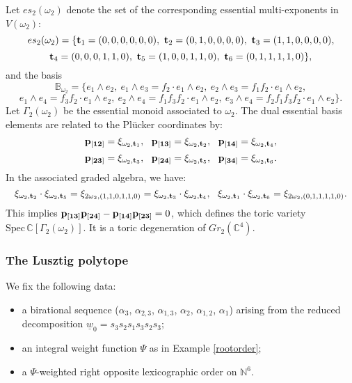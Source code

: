 \documentclass{emsprocart}
\theoremstyle{definition}
\begin{document}
Let $es_2(\omega_2)$ denote the set of the corresponding essential multi-exponents in $V(\omega_2)$:
$$es_2(\omega_2)=\{\bold{t}_1=(0,0,0,0,0,0),\ \bold{t}_2=(0,1,0,0,0,0),\ \bold{t}_3=(1,1,0,0,0,0),$$ $$\bold{t}_4=(0,0,0,1,1,0),\ \bold{t}_5=(1,0,0,1,1,0),\ \bold{t}_6=(0,1,1,1,1,0)\},$$
and the basis
$$\mathbb{B}_{\omega_2}=\{e_1\wedge e_2,\ e_1\wedge e_3=f_2\cdot e_1\wedge e_2,\ e_2\wedge e_3=f_1f_2\cdot e_1\wedge e_2,$$
$$e_1\wedge e_4=f_3f_2\cdot e_1\wedge e_2,\ e_2\wedge e_4=f_1f_3f_2\cdot e_1\wedge e_2,\ e_3\wedge e_4=f_2f_1f_3f_2\cdot e_1\wedge e_2\}.$$
Let $\Gamma_2(\omega_2)$ be the essential monoid associated to $\omega_2$. The dual essential basis elements are related to the Pl\"ucker coordinates by:
$$\bold{p_{[12]}}=\xi_{\omega_2,\bold{t}_1},\ \ \bold{p_{[13]}}=\xi_{\omega_2,\bold{t}_2},\ \ \bold{p_{[14]}}=\xi_{\omega_2,\bold{t}_4},$$
$$\bold{p_{[23]}}=\xi_{\omega_2,\bold{t}_3},\ \ \bold{p_{[24]}}=\xi_{\omega_2,\bold{t}_5},\ \ \bold{p_{[34]}}=\xi_{\omega_2,\bold{t}_6}.$$
In the associated graded algebra, we have:
$$\xi_{\omega_2,\bold{t}_2}\cdot \xi_{\omega_2,\bold{t}_5}=\xi_{2\omega_2,(1,1,0,1,1,0)}=\xi_{\omega_2,\bold{t}_3}\cdot \xi_{\omega_2,\bold{t}_4},\ \  \xi_{\omega_2,\bold{t}_1}\cdot \xi_{\omega_2,\bold{t}_6}=\xi_{2\omega_2,(0,1,1,1,1,0)}.$$
This implies $\bold{p_{[13]}}\bold{p_{[24]}}-\bold{p_{[14]}}\bold{p_{[23]}}=0$, which defines the toric variety $\textrm{Spec}\,\mathbb{C}[\Gamma_2(\omega_2)]$. It is a toric degeneration of $Gr_{2}(\mathbb C^4)$.



\subsubsection{The Lusztig polytope}
We fix the following data:
\begin{itemize}
\item a birational sequence ($\alpha_3$, $\alpha_{2,3}$, $\alpha_{1,3}$, $\alpha_2$, $\alpha_{1,2}$, $\alpha_1$) arising from the reduced decomposition $\underline{w}_0=s_3s_2s_1s_3s_2s_3$;
\item an integral weight function $\Psi$ as in Example \ref{rootorder};
\item a $\Psi$-weighted right opposite lexicographic order on $\mathbb{N}^6$.
\end{itemize}
\end{document}

